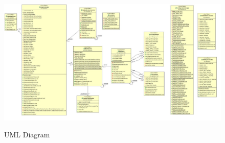 \documentclass[hidelinks,conference,12pt]{IEEETran}
\begin{document}
 \FloatBarrier
 \begin{figure}[!h]
 	\centering
 	\caption{UML Diagram}
 	\includegraphics[scale=0.34]{images/UML_Diag.jpeg}
 	\label{img:UML_Diag}
 \end{figure}
 \FloatBarrier
 
\end{document}
